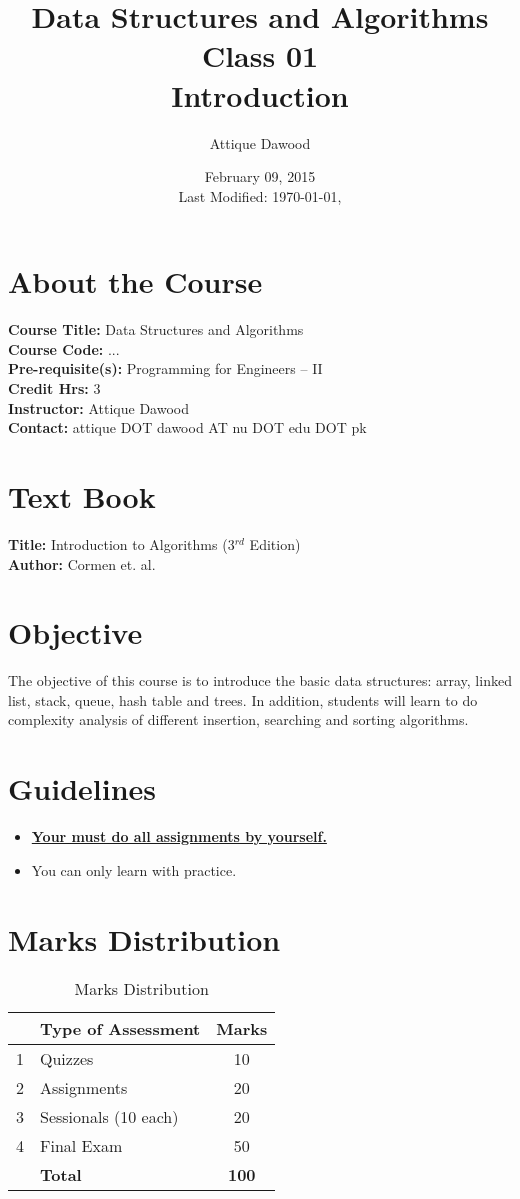\documentclass[12pt,a4paper]{article}
\title{Data Structures and Algorithms\\Class 01\\Introduction}
\author{Attique Dawood}
\date{February 09, 2015\\[0.2cm] Last Modified: \today, \currenttime}
\begin{document}
\maketitle
\section{About the Course}
\textbf{Course Title:} Data Structures and Algorithms\\
\textbf{Course Code:} ...\\
\textbf{Pre-requisite(s):} Programming for Engineers -- II\\
\textbf{Credit Hrs:} 3\\
\textbf{Instructor:} Attique Dawood\\
\textbf{Contact:} attique DOT dawood AT nu DOT edu DOT pk\\
\section{Text Book}
\textbf{Title:} Introduction to Algorithms (3$^{rd}$ Edition)\\
\textbf{Author:} Cormen et. al.\\
\section{Objective}
The objective of this course is to introduce the basic data structures: array, linked list, stack, queue, hash table and trees. In addition, students will learn to do complexity analysis of different insertion, searching and sorting algorithms.
\section{Guidelines}
\begin{itemize}
\item \textbf{\underline{Your must do all assignments by yourself.}}
\item You can only learn with practice.
\end{itemize}
\section{Marks Distribution}
\begin{table}[H]
\begin{center}
\vspace{0.3cm}
	\begin{tabular}{llc}
	\hline \hline
		\rule{0pt}{2.6ex} & \textbf{Type of Assessment} & \textbf{Marks}\\
		\hline
		1 \rule{0pt}{2.6ex} & Quizzes & 10\\
		2 & Assignments& 20\\
		3 & Sessionals (10 each) & 20\\
		4 & Final Exam & 50\\
	\hline \hline
	\rule{0pt}{2.6ex} & \textbf{Total} & \textbf{100}\\
	\hline \hline
	\end{tabular}
\end{center}
\label{Marks Distribution}
\caption{Marks Distribution}
\end{table}
\end{document}
